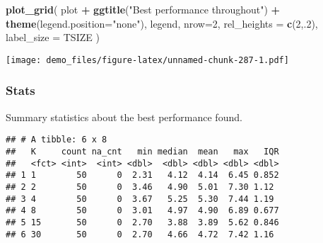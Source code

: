 \documentclass[]{book}
\newenvironment{Shaded}{\begin{snugshade}}{\end{snugshade}}
\newcommand{\DataTypeTok}[1]{\textcolor[rgb]{0.13,0.29,0.53}{#1}}
\newcommand{\DecValTok}[1]{\textcolor[rgb]{0.00,0.00,0.81}{#1}}
\newcommand{\KeywordTok}[1]{\textcolor[rgb]{0.13,0.29,0.53}{\textbf{#1}}}
\newcommand{\NormalTok}[1]{#1}
\newcommand{\OperatorTok}[1]{\textcolor[rgb]{0.81,0.36,0.00}{\textbf{#1}}}
\newcommand{\OtherTok}[1]{\textcolor[rgb]{0.56,0.35,0.01}{#1}}
\newcommand{\StringTok}[1]{\textcolor[rgb]{0.31,0.60,0.02}{#1}}
\begin{document}
\begin{Shaded}
\begin{Highlighting}[]
\KeywordTok{plot_grid}\NormalTok{(}
\NormalTok{  plot }\OperatorTok{+}
\StringTok{    }\KeywordTok{ggtitle}\NormalTok{(}\StringTok{"Best performance throughout"}\NormalTok{) }\OperatorTok{+}
\StringTok{    }\KeywordTok{theme}\NormalTok{(}\DataTypeTok{legend.position=}\StringTok{"none"}\NormalTok{),}
\NormalTok{  legend,}
  \DataTypeTok{nrow=}\DecValTok{2}\NormalTok{,}
  \DataTypeTok{rel_heights =} \KeywordTok{c}\NormalTok{(}\DecValTok{2}\NormalTok{,.}\DecValTok{2}\NormalTok{),}
  \DataTypeTok{label_size =}\NormalTok{ TSIZE}
\NormalTok{)}
\end{Highlighting}
\end{Shaded}

\texttt{[image: demo\_files/figure-latex/unnamed-chunk-287-1.pdf]}

\hypertarget{stats-54}{%
\subsubsection{Stats}\label{stats-54}}

Summary statistics about the best performance found.

\begin{Shaded}
\end{Shaded}

\begin{verbatim}
## # A tibble: 6 x 8
##   K     count na_cnt   min median  mean   max   IQR
##   <fct> <int>  <int> <dbl>  <dbl> <dbl> <dbl> <dbl>
## 1 1        50      0  2.31   4.12  4.14  6.45 0.852
## 2 2        50      0  3.46   4.90  5.01  7.30 1.12 
## 3 4        50      0  3.67   5.25  5.30  7.44 1.19 
## 4 8        50      0  3.01   4.97  4.90  6.89 0.677
## 5 15       50      0  2.70   3.88  3.89  5.62 0.846
## 6 30       50      0  2.70   4.66  4.72  7.42 1.16
\end{verbatim}
\end{document}
